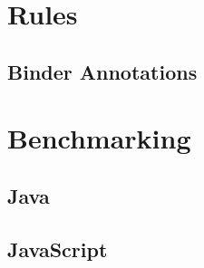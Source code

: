 
\renewcommand*\appendixtocname{Appendix}
\begin{appendices}

\chapter{Rules}
\section{Binder Annotations}


\chapter{Benchmarking}
\section{Java}
\section{JavaScript}

\end{appendices}

